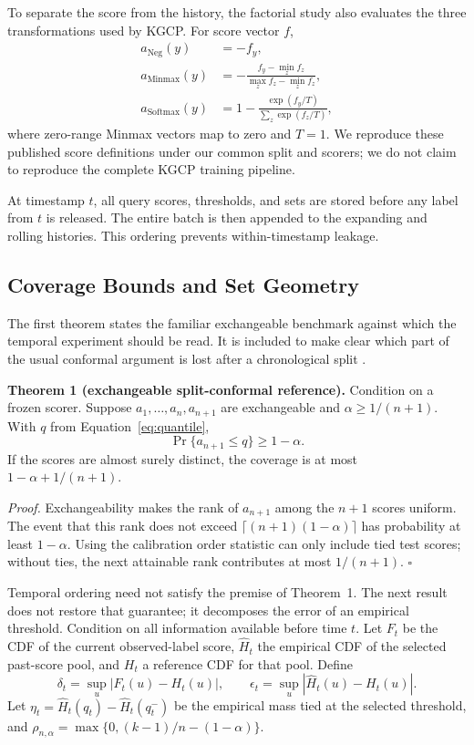 \documentclass[information,article,submit,oneauthor,pdftex]{Definitions/mdpi}
\begin{document}
To separate the score from the history, the factorial study also evaluates the
three transformations used by KGCP. For score vector \(f\),
\[
\begin{aligned}
 a_{\mathrm{Neg}}(y)&=-f_y,\\
 a_{\mathrm{Minmax}}(y)&=-\frac{f_y-\min_z f_z}{\max_z f_z-\min_z f_z},\\
 a_{\mathrm{Softmax}}(y)&=1-\frac{\exp(f_y/T)}{\sum_z\exp(f_z/T)},
\end{aligned}
\tag{3}\label{eq:scores}
\]
where zero-range Minmax vectors map to zero and \(T=1\). We reproduce these
published score definitions under our common split and scorers; we do not claim
to reproduce the complete KGCP training pipeline.

At timestamp \(t\), all query scores, thresholds, and sets are stored before
any label from \(t\) is released. The entire batch is then appended to the
expanding and rolling histories. This ordering prevents within-timestamp
leakage.

\subsection{Coverage Bounds and Set Geometry}

The first theorem states the familiar exchangeable benchmark against which the
temporal experiment should be read. It is included to make clear which part of
the usual conformal argument is lost after a chronological split
\cite{vovk2005algorithmic,angelopoulos2023gentle}.

\noindent\textbf{Theorem 1 (exchangeable split-conformal reference).}\quad
Condition on a frozen scorer. Suppose \(a_1,\ldots,a_n,a_{n+1}\) are
exchangeable and \(\alpha\ge 1/(n+1)\). With \(q\) from
Equation~\eqref{eq:quantile},
\[
 \Pr\{a_{n+1}\le q\}\ge 1-\alpha.
 \tag{4}\label{eq:exchangeable}
\]
If the scores are almost surely distinct, the coverage is at most
\(1-\alpha+1/(n+1)\).

\emph{Proof.}
Exchangeability makes the rank of \(a_{n+1}\) among the \(n+1\) scores uniform.
The event that this rank does not exceed
\(\lceil(n+1)(1-\alpha)\rceil\) has probability at least \(1-\alpha\).
Using the calibration order statistic can only include tied test scores; without
ties, the next attainable rank contributes at most \(1/(n+1)\). \hfill\(\square\)

Temporal ordering need not satisfy the premise of Theorem~1. The next result
does not restore that guarantee; it decomposes the error of an empirical
threshold. Condition on all information available before time \(t\). Let
\(F_t\) be the CDF of the current observed-label score, \(\widehat H_t\) the
empirical CDF of the selected past-score pool, and \(H_t\) a reference CDF for
that pool. Define
\[
 \delta_t=\sup_u|F_t(u)-H_t(u)|,\qquad
 \epsilon_t=\sup_u|\widehat H_t(u)-H_t(u)|.
\]
Let \(\eta_t=\widehat H_t(q_t)-\widehat H_t(q_t^-)\) be the empirical mass tied
at the selected threshold, and
\(\rho_{n,\alpha}=\max\{0,(k-1)/n-(1-\alpha)\}\).
\end{document}
